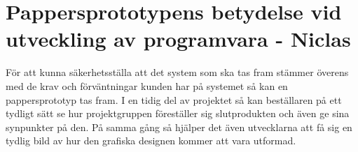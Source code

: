 \section{Pappersprototypens betydelse vid utveckling av programvara - Niclas}
För att kunna säkerhetsställa att det system som ska tas fram stämmer överens med de krav och förväntningar kunden har på systemet så kan en pappersprototyp tas fram. I en tidig del av projektet så kan beställaren på ett tydligt sätt se hur projektgruppen föreställer sig slutprodukten och även ge sina synpunkter på den. På samma gång så hjälper det även utvecklarna att få sig en tydlig bild av hur den grafiska designen kommer att vara utformad.
